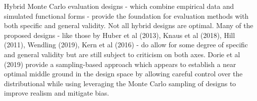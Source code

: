 \documentclass[../main.tex]{subfiles}
\begin{document}
Hybrid Monte Carlo evaluation designs - which combine empirical data and simulated functional forms - provide the foundation for evaluation methods with both specific and general validity. Not all hybrid designs are optimal. Many of the proposed designs - like those by Huber et al (2013), Knaus et al (2018), Hill (2011), Wendling (2019), Kern et al (2016) - do allow for some degree of specific and general validity but are still subject to criticism on both axes. Dorie et al (2019) provide a sampling-based approach which appears to establish a near optimal middle ground in the design space by allowing careful control over the distributional while using leveraging the Monte Carlo sampling of designs to improve realism and mitigate bias.\par


\vspace{\baselineskip}

\vspace{\baselineskip}

\vspace{\baselineskip}

\vspace{\baselineskip}

\vspace{\baselineskip}

\vspace{\baselineskip}

\printbibliography
\end{document}
